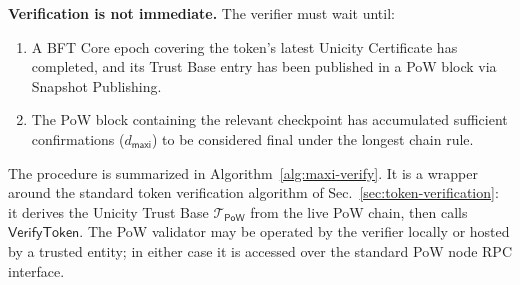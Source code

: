\textbf{Verification is not immediate.} The verifier must wait until:
\begin{enumerate}[nosep]
  \item A BFT Core epoch covering the token's latest Unicity Certificate has completed, and its Trust Base entry has been published in a PoW block via Snapshot Publishing.
  \item The PoW block containing the relevant checkpoint has accumulated sufficient confirmations ($d_\mathsf{maxi}$) to be considered final under the longest chain rule.
\end{enumerate}

The procedure is summarized in Algorithm~\ref{alg:maxi-verify}. It is a wrapper around the standard token verification algorithm of Sec.~\ref{sec:token-verification}: it derives the Unicity Trust Base $\mathcal{T}_\mathsf{PoW}$ from the live PoW chain, then calls $\mathsf{VerifyToken}$. The PoW validator may be operated by the verifier locally or hosted by a trusted entity; in either case it is accessed over the standard PoW node RPC interface.


